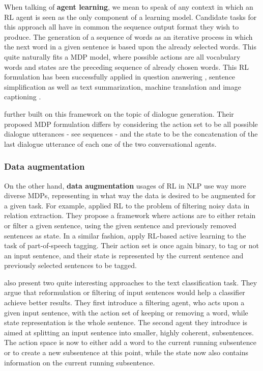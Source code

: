 \documentclass[twocolumn]{article}
\begin{document}
When talking of \textbf{agent learning}, we mean to speak of any context in which an RL agent is seen as the only component of a learning model. Candidate tasks for this approach all have in common the sequence output format they wish to produce. The generation of a sequence of words as an iterative process in which the next word in a given sentence is based upon the already selected words. This quite naturally fits a MDP model, where possible actions are all vocabulary words and states are the preceding sequence of already chosen words. This RL formulation has been successfully applied in question answering \citep{DBLP:journals/corr/BuckBCGHGW17}, sentence simplification \citep{sentence_simplification} as well as text summarization, machine translation and image captioning \citep{ranzatoCAZ15}.

\citep{DBLP:journals/corr/Li17b} further built on this framework on the topic of dialogue generation. Their proposed MDP formulation differs by considering the action set to be all possible dialogue utterances - see sequences - and the state to be the concatenation of the last dialogue utterance of each one of the two conversational agents.

\subsubsection{Data augmentation}

On the other hand, \textbf{data augmentation} usages of RL in NLP use way more diverse MDPs, representing in what way the data is desired to be augmented for a given task. For example, \citep{DBLP:journals/corr/abs-1805-09927} applied RL to the problem of filtering noisy data in relation extraction. They propose a framework where actions are to either retain or filter a given sentence, using the given sentence and previously removed sentences as state. In a similar fashion, \citep{DBLP:active_learning} apply RL-based active learning to the task of part-of-speech tagging. Their action set is once again binary, to tag or not an input sentence, and their state is represented by the current sentence and previously selected sentences to be tagged.

\citep{learning-structured-representation-text-classification-via-reinforcement-learning} also present two quite interesting approaches to the text classification task. They argue that reformulation or filtering of input sentences would help a classifier achieve better results. They first introduce a filtering agent, who acts upon a given input sentence, with the action set of keeping or removing a word, while state representation is the whole sentence. The second agent they introduce is aimed at splitting an input sentence into smaller, highly coherent, subsentences. The action space is now to either add a word to the current running subsentence or to create a new subsentence at this point, while the state now also contains information on the current running subsentence.
\end{document}
